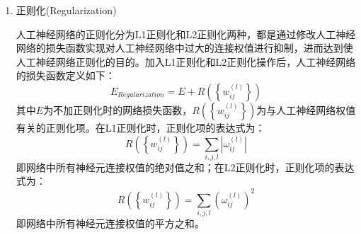 \documentclass[a4paper]{ctexart}
\begin{document}
\begin{enumerate}
	\item 正则化(Regularization)

	      人工神经网络的正则化分为L1正则化和L2正则化两种，都是通过修改人工神经网络的损失函数实现对人工神经网络中过大的连接权值进行抑制，进而达到使人工神经网络正则化的目的。加入L1正则化和L2正则化操作后，人工神经网络的损失函数定义如下\cite{RN2}：
	      \begin{equation}
		      E_{Regularization}=E+R(\left\{w_{ij}^{(l)}\right\})
	      \end{equation}
	      其中$E$为不加正则化时的网络损失函数，$R(\left\{w_{ij}^{(l)}\right\})$为与人工神经网络权值有关的正则化项。在L1正则化时，正则化项的表达式为：
	      \begin{equation}
		      R(\left\{w_{ij}^{(l)}\right\})=\sum_{i,j,l}|\omega_{ij}^{(l)}|
	      \end{equation}
	      即网络中所有神经元连接权值的绝对值之和；在L2正则化时，正则化项的表达式为：
	      \begin{equation}
		      R(\left\{w_{ij}^{(l)}\right\})=\sum_{i,j,l}(\omega_{ij}^{(l)})^2
	      \end{equation}
	      即网络中所有神经元连接权值的平方之和。

\end{enumerate}
\end{document}
